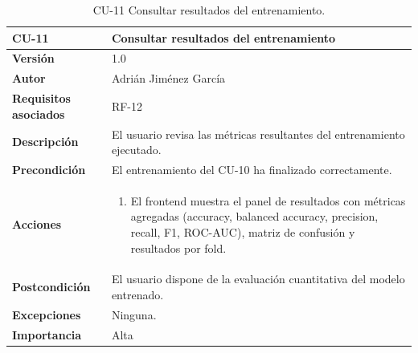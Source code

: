 \begin{table}[p]
	\centering
	\begin{tabularx}{\linewidth}{ p{} X }
		\toprule
		\textbf{CU-11}    & \textbf{Consultar resultados del entrenamiento}\\
		\toprule
		\textbf{Versión}              & 1.0 \\
		\textbf{Autor}                & Adrián Jiménez García \\
		\textbf{Requisitos asociados} & RF-12 \\
		\textbf{Descripción}          & El usuario revisa las métricas resultantes del entrenamiento ejecutado. \\
		\textbf{Precondición}         & El entrenamiento del CU-10 ha finalizado correctamente. \\
		\textbf{Acciones}             &
		\begin{enumerate}
			\def\labelenumi{\arabic{enumi}.}
			\tightlist
			\item El frontend muestra el panel de resultados con métricas agregadas (accuracy, balanced accuracy, precision, recall, F1, ROC-AUC), matriz de confusión y resultados por fold.
		\end{enumerate}\\
		\textbf{Postcondición}        & El usuario dispone de la evaluación cuantitativa del modelo entrenado. \\
		\textbf{Excepciones}          & Ninguna. \\
		\textbf{Importancia}          & Alta \\
		\bottomrule
	\end{tabularx}
	\caption{CU-11 Consultar resultados del entrenamiento.}
\end{table}

